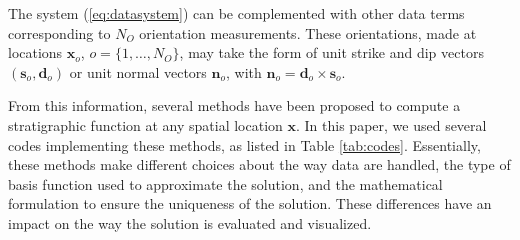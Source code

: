 \documentclass[preprint]{ring20}
\newcommand{\bx}{\mathbf{x}}
\newcommand{\bn}{\mathbf{n}}
\begin{document}
The system (\ref{eq:datasystem}) can be complemented with other data terms corresponding to $N_O$ orientation measurements. These orientations, made at locations 
$\bx_o$, $o = \{1, \ldots, N_O\}$, may take the form of unit strike and dip vectors $(\mathbf{s}_o, \mathbf{d}_o)$ or unit normal vectors $\bn_o$, with $\mathbf{n}_o = \mathbf{d}_o \times \mathbf{s}_o$.  
 
From this information, several methods have been proposed to compute a stratigraphic function at any spatial location $\bx$. 
In this paper, we used several codes implementing these methods, as listed in Table \ref{tab:codes}. 
Essentially, these methods make different choices about the way data are handled, the type of basis function used to approximate the solution, and the mathematical formulation to ensure the uniqueness of the solution. These differences have an impact on the way the solution is evaluated and visualized. 
\end{document}
